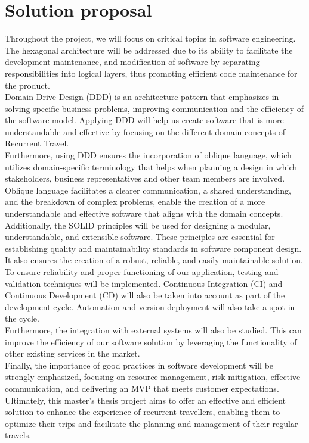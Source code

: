 \documentclass[../memory.tex]{subfiles}
\begin{document}
\section{Solution proposal}
Throughout the project, we will focus on critical topics in software engineering.
The hexagonal architecture will be addressed due to its ability to facilitate the
development maintenance, and modification of software by separating
responsibilities into logical layers, thus promoting efficient code maintenance
for the product.
\\[8pt]
Domain-Drive Design (DDD) is an architecture pattern that emphasizes in solving
specific business problems, improving communication and the efficiency of the
software model. Applying DDD will help us create software that is more
understandable and effective by focusing on the different domain concepts of
Recurrent Travel.
\\
Furthermore, using DDD ensures the incorporation of oblique language, which
utilizes domain-specific terminology that helps when planning a design in which
stakeholders, business representatives and other team members are involved.
Oblique language facilitates a clearer communication, a shared understanding,
and the breakdown of complex problems, enable the creation of a more
understandable and effective software that aligns with the domain concepts.
\\[8pt]
Additionally, the SOLID principles will be used for designing a modular,
understandable, and extensible software. These principles are essential for
establishing quality and maintainability standards in software component design.
It also ensures the creation of a robust, reliable, and easily maintainable
solution.
\\[8pt]
To ensure reliability and proper functioning of our application, testing and
validation techniques will be implemented. Continuous Integration (CI) and
Continuous Development (CD) will also be taken into account as part of the
development cycle. Automation and version deployment will also take a spot in
the cycle.
\\[8pt]
Furthermore, the integration with external systems will also be studied. This can
improve the efficiency of our software solution by leveraging the functionality
of other existing services in the market.
\\[8pt]
Finally, the importance of good practices in software development will be
strongly emphasized, focusing on resource management, risk mitigation, effective
communication, and delivering an MVP that meets customer expectations.
\\
Ultimately, this master's thesis project aims to offer an effective and
efficient solution to enhance the experience of recurrent travellers, enabling
them to optimize their trips and facilitate the planning and management of their
regular travels.
\end{document}
